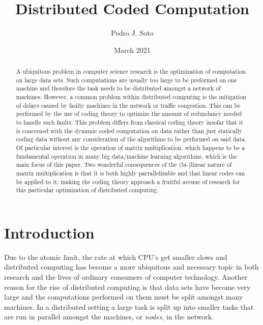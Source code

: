 \documentclass{report}
\title{Distributed Coded Computation}
\author{Pedro J. Soto}
\date{March 2021}
\begin{document}
\maketitle

\begin{abstract}
A ubiquitous problem in computer science research is the optimization of computation on large data sets. Such computations are usually too large to be preformed on one machine and therefore the task needs to be distributed amongst a network of machines. However, a common problem within distributed computing is the mitigation of delays caused by faulty machines in the network or traffic congestion. This can be performed by the use of coding theory to optimize the amount of redundancy needed to handle such faults.  This problem differs from classical coding theory insofar that it is concerned with the dynamic coded computation on data rather than just statically coding data without any consideration of the algorithms to be performed on said data. Of particular interest is the operation of matrix multiplication, which happens to be a fundamental operation in many big data/machine learning algorithms, which is the main focus of this paper. Two wonderful consequences of the (bi-)linear nature of matrix multiplication is that it is both highly parrallelizable and that linear codes can be applied to it; making the coding theory approach a fruitful avenue of research for this particular optimization of distributed computing. 
\end{abstract}

\tableofcontents



\chapter{Introduction}

Due to the atomic limit, the rate at which CPU's get smaller slows and distributed computing has become a more ubiquitous and necessary topic in both research and the lives of ordinary consumers of computer technology. 
Another reason for the rise of distributed computing is that data sets have become very large and the computations performed on them must be split amongst many machines. 
In a distributed setting a large task is split up into smaller tasks that are run in parallel amongst the machines, or \textit{nodes}, in the network. 
\end{document}
